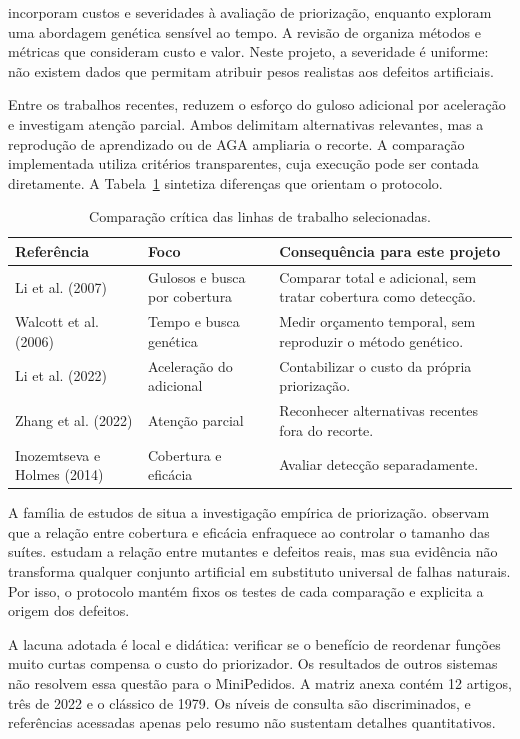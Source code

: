\documentclass[12pt]{article}
\begin{document}
\cite{R02} incorporam custos e severidades à avaliação de priorização, enquanto \cite{R05} exploram uma abordagem genética sensível ao tempo. A revisão de \cite{R10} organiza métodos e métricas que consideram custo e valor. Neste projeto, a severidade é uniforme: não existem dados que permitam atribuir pesos realistas aos defeitos artificiais.

Entre os trabalhos recentes, \cite{R08} reduzem o esforço do guloso adicional por aceleração e \cite{R09} investigam atenção parcial. Ambos delimitam alternativas relevantes, mas a reprodução de aprendizado ou de AGA ampliaria o recorte. A comparação implementada utiliza critérios transparentes, cuja execução pode ser contada diretamente. A Tabela~\ref{tab:rel} sintetiza diferenças que orientam o protocolo.

\begin{table}[ht]
\centering\caption{Comparação crítica das linhas de trabalho selecionadas.}\label{tab:rel}
\small
\begin{tabular}{p{2.7cm}p{4.4cm}p{6.3cm}}\toprule
Referência & Foco & Consequência para este projeto\\\midrule
Li et al. (2007) & Gulosos e busca por cobertura & Comparar total e adicional, sem tratar cobertura como detecção.\\
Walcott et al. (2006) & Tempo e busca genética & Medir orçamento temporal, sem reproduzir o método genético.\\
Li et al. (2022) & Aceleração do adicional & Contabilizar o custo da própria priorização.\\
Zhang et al. (2022) & Atenção parcial & Reconhecer alternativas recentes fora do recorte.\\
Inozemtseva e Holmes (2014) & Cobertura e eficácia & Avaliar detecção separadamente.\\\bottomrule
\end{tabular}
\end{table}

A família de estudos de \cite{R03} situa a investigação empírica de priorização. \cite{R11} observam que a relação entre cobertura e eficácia enfraquece ao controlar o tamanho das suítes. \cite{R12} estudam a relação entre mutantes e defeitos reais, mas sua evidência não transforma qualquer conjunto artificial em substituto universal de falhas naturais. Por isso, o protocolo mantém fixos os testes de cada comparação e explicita a origem dos defeitos.

A lacuna adotada é local e didática: verificar se o benefício de reordenar funções muito curtas compensa o custo do priorizador. Os resultados de outros sistemas não resolvem essa questão para o MiniPedidos. A matriz anexa contém 12 artigos, três de 2022 e o clássico de 1979. Os níveis de consulta são discriminados, e referências acessadas apenas pelo resumo não sustentam detalhes quantitativos.
\end{document}
